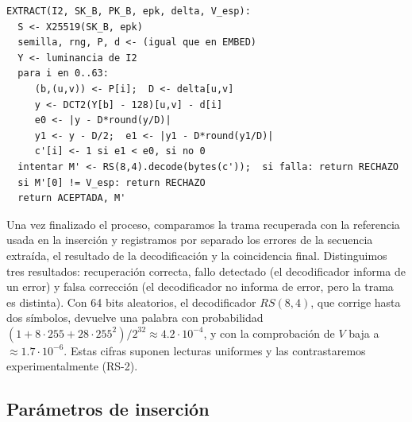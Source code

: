 \documentclass[IB]{TFUOC}%
\begin{document}
\begin{small}
\begin{verbatim}
EXTRACT(I2, SK_B, PK_B, epk, delta, V_esp):
  S <- X25519(SK_B, epk)
  semilla, rng, P, d <- (igual que en EMBED)
  Y <- luminancia de I2
  para i en 0..63:
     (b,(u,v)) <- P[i];  D <- delta[u,v]
     y <- DCT2(Y[b] - 128)[u,v] - d[i]
     e0 <- |y - D*round(y/D)|
     y1 <- y - D/2;  e1 <- |y1 - D*round(y1/D)|
     c'[i] <- 1 si e1 < e0, si no 0
  intentar M' <- RS(8,4).decode(bytes(c'));  si falla: return RECHAZO
  si M'[0] != V_esp: return RECHAZO
  return ACEPTADA, M'
\end{verbatim}
\end{small}

Una vez finalizado el proceso, comparamos la trama recuperada con la referencia usada en la inserción y registramos por separado los errores de la secuencia extraída, el resultado de la decodificación y la coincidencia final. Distinguimos tres resultados: recuperación correcta, fallo detectado (el decodificador informa de un error) y falsa corrección (el decodificador no informa de error, pero la trama es distinta). Con 64 bits aleatorios, el decodificador $RS(8,4)$, que corrige hasta dos símbolos, devuelve una palabra con probabilidad $\left(1+8\cdot255+28\cdot255^2\right)/2^{32}\approx 4{.}2\cdot10^{-4}$, y con la comprobación de $V$ baja a $\approx 1{.}7\cdot10^{-6}$. Estas cifras suponen lecturas uniformes y las contrastaremos experimentalmente (RS-2).

\subsection{Parámetros de inserción}
\label{subsec:parametros}
\end{document}
